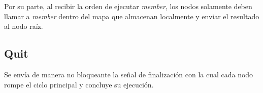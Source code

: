 Por su parte, al recibir la orden de ejecutar \textit{member}, los nodos
solamente deben llamar a \textit{member} dentro del mapa que almacenan
localmente y enviar el resultado al nodo raíz.

\subsection{Quit}

Se envía de manera no bloqueante la señal de finalización con la cual cada
nodo rompe el ciclo principal y concluye su ejecución.
